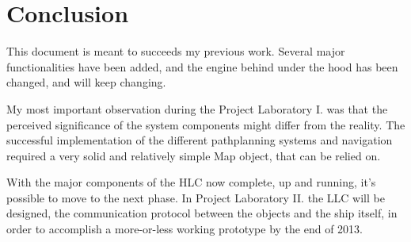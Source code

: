 \section{Conclusion}
This document is meant to succeeds my previous work\cite{aau}. Several major functionalities have been added, and the engine behind under the hood has been changed, and will keep changing.

My most important observation during the Project Laboratory I. was that the perceived significance of the system components might differ from the reality. The successful implementation of the different pathplanning systems and navigation required a very solid and relatively simple Map object, that can be relied on.

With the major components of the HLC now complete, up and running, it's possible to move to the next phase. In Project Laboratory II. the LLC will be designed, the communication protocol between the objects and the ship itself, in order to accomplish a more-or-less working prototype by the end of 2013.